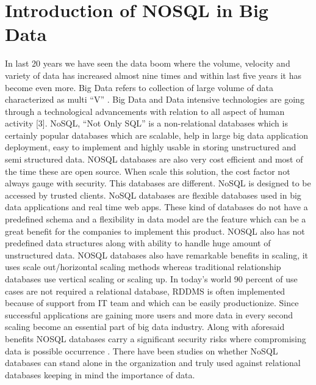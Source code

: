 \documentclass[sigconf]{acmart}
\begin{document}
\section{Introduction of NOSQL in Big Data}
In last 20 years we have seen the data boom where the volume, velocity and variety of data has increased almost nine times and within last five years it has become even more. Big Data refers to collection of large volume of data characterized as multi “V” \cite{editor01}. Big Data and Data intensive technologies are going through a technological advancements with relation to all aspect of human activity [3]. NoSQL, “Not Only SQL” is a non-relational databases which is certainly popular databases which are scalable, help in large big data application deployment, easy to implement and highly usable in storing unstructured and semi structured data. NOSQL databases are also very cost efficient and most of the time these are open source. When scale this solution, the cost factor not always gauge with security. This databases are different. NoSQL is designed to be accessed by trusted clients. NoSQL databases are flexible databases used in big data applications and real time web apps. These kind of databases do not have a predefined schema and a flexibility in data model are the feature which can be a great benefit for the companies to implement this product\cite{editor01}. NOSQL also has not predefined data structures along with ability to handle huge amount of unstructured data. NOSQL databases also have remarkable benefits in scaling, it uses scale out/horizontal scaling methods whereas traditional relationship databases use vertical scaling or scaling up. In today’s world 90 percent of use cases are not required a relational database, RDDMS is often implemented because of support from IT team and which can be easily productionize. Since successful applications are gaining more users and more data in every second scaling become an essential part of big data industry. Along with aforesaid benefits NOSQL databases carry a significant security risks where compromising data is possible occurrence \cite{editor02}. There have been studies on whether NoSQL databases can stand alone in the organization and truly used against relational databases keeping in mind the importance of data. 
\end{document}
